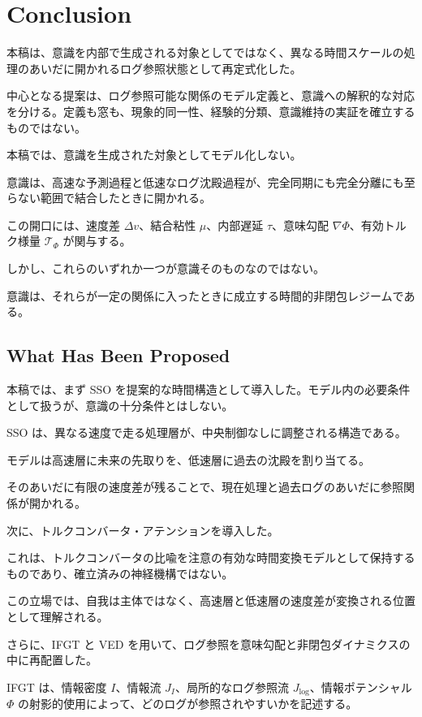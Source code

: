 \section{Conclusion}


本稿は、意識を内部で生成される対象としてではなく、異なる時間スケールの処理のあいだに開かれるログ参照状態として再定式化した。

中心となる提案は、ログ参照可能な関係のモデル定義と、意識への解釈的な対応を分ける。定義も窓も、現象的同一性、経験的分類、意識維持の実証を確立するものではない。

本稿では、意識を生成された対象としてモデル化しない。

意識は、高速な予測過程と低速なログ沈殿過程が、完全同期にも完全分離にも至らない範囲で結合したときに開かれる。

この開口には、速度差 $\Delta v$、結合粘性 $\mu$、内部遅延 $\tau$、意味勾配 $\nabla \Phi$、有効トルク様量 $\mathcal{T}_{\Phi}$ が関与する。

しかし、これらのいずれか一つが意識そのものなのではない。

意識は、それらが一定の関係に入ったときに成立する時間的非閉包レジームである。

\subsection{What Has Been Proposed}

本稿では、まず SSO を提案的な時間構造として導入した。モデル内の必要条件として扱うが、意識の十分条件とはしない。

SSO は、異なる速度で走る処理層が、中央制御なしに調整される構造である。

モデルは高速層に未来の先取りを、低速層に過去の沈殿を割り当てる。

そのあいだに有限の速度差が残ることで、現在処理と過去ログのあいだに参照関係が開かれる。

次に、トルクコンバータ・アテンションを導入した。

これは、トルクコンバータの比喩を注意の有効な時間変換モデルとして保持するものであり、確立済みの神経機構ではない。

この立場では、自我は主体ではなく、高速層と低速層の速度差が変換される位置として理解される。

さらに、IFGT と VED を用いて、ログ参照を意味勾配と非閉包ダイナミクスの中に再配置した。

IFGT は、情報密度 $I$、情報流 $J_I$、局所的なログ参照流 $J_{\log}$、情報ポテンシャル $\Phi$ の射影的使用によって、どのログが参照されやすいかを記述する。

